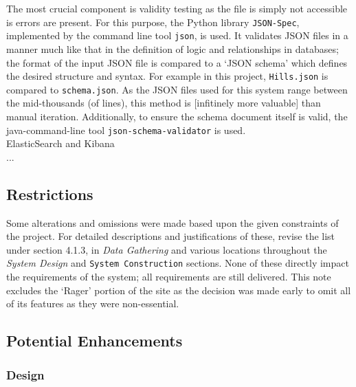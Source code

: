 \documentclass[11pt, english]{article}
\begin{document}
			The most crucial component is validity testing as the file is simply not accessible is errors are present. For this purpose, the Python library \texttt{JSON-Spec}, implemented by the command line tool \texttt{json}, is used. It validates JSON files in a manner much like that in the definition of logic and relationships in databases; the format of the input JSON file is compared to a `JSON schema' which defines the desired structure and syntax. For example in this project, \texttt{Hills.json} is compared to \texttt{schema.json}. As the JSON files used for this system range between the mid-thousands (of lines), this method is [infitinely more valuable] than manual iteration. Additionally, to ensure the schema document itself is valid, the java-command-line tool \texttt{json-schema-validator} is used.\\

	ElasticSearch and Kibana\\

	...

	\subsection{Restrictions}

	Some alterations and omissions were made based upon the given constraints of the project. For detailed descriptions and justifications of these, revise the list under section 4.1.3, in \textit{Data Gathering} and various locations throughout the \textit{System Design} and \texttt{System Construction} sections. None of these directly impact the requirements of the system; all requirements are still delivered. This note excludes the `Rager' portion of the site as the decision was made early to omit all of its features as they were non-essential.

	\subsection{Potential Enhancements}

		\subsubsection{Design}
	
\end{document}
